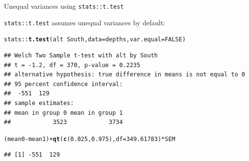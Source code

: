 \documentclass[10pt]{beamer}\usepackage[]{graphicx}\usepackage[]{color}
\makeatletter
\newcommand{\hlnum}[1]{\textcolor[rgb]{0.686,0.059,0.569}{#1}}%
\newcommand{\hlopt}[1]{\textcolor[rgb]{0,0,0}{#1}}%
\newcommand{\hlstd}[1]{\textcolor[rgb]{0.345,0.345,0.345}{#1}}%
\newcommand{\hlkwc}[1]{\textcolor[rgb]{0.333,0.667,0.333}{#1}}%
\newcommand{\hlkwd}[1]{\textcolor[rgb]{0.737,0.353,0.396}{\textbf{#1}}}%
\newenvironment{kframe}{%
 \def\at@end@of@kframe{}%
 \ifinner\ifhmode%
  \def\at@end@of@kframe{\end{minipage}}%
  \begin{minipage}{\columnwidth}%
 \fi\fi%
 \def\FrameCommand##1{\hskip\@totalleftmargin \hskip-\fboxsep
 \colorbox{shadecolor}{##1}\hskip-\fboxsep
     \hskip-\linewidth \hskip-\@totalleftmargin \hskip\columnwidth}%
 \MakeFramed {\advance\hsize-\width
   \@totalleftmargin\z@ \linewidth\hsize
   \@setminipage}}%
 {\par\unskip\endMakeFramed%
 \at@end@of@kframe}
\newenvironment{knitrout}{}{} %
\makeatother
\begin{document}
\begin{frame}[fragile]{Unequal variances using \texttt{stats::t.test}}
	
	\texttt{stats::t.test} assumes unequal variances by default:
	
	
\begin{knitrout}\scriptsize
{}\color{fgcolor}\begin{kframe}
\begin{alltt}
\hlstd{stats}\hlopt{::}\hlkwd{t.test}\hlstd{(alt} \hlopt{~} \hlstd{South,} \hlkwc{data} \hlstd{= depths,} \hlkwc{var.equal} \hlstd{=} \hlnum{FALSE}\hlstd{)}
\end{alltt}
\begin{verbatim}
## Welch Two Sample t-test with alt by South 
## t = -1.2, df = 370, p-value = 0.2235
## alternative hypothesis: true difference in means is not equal to 0 
## 95 percent confidence interval:
##  -551  129 
## sample estimates:
## mean in group 0 mean in group 1 
##            3523            3734
\end{verbatim}
\begin{alltt}
\hlstd{(mean0} \hlopt{-} \hlstd{mean1)} \hlopt{+} \hlkwd{qt}\hlstd{(}\hlkwd{c}\hlstd{(}\hlnum{0.025}\hlstd{,} \hlnum{0.975}\hlstd{),} \hlkwc{df} \hlstd{=} \hlnum{349.61783}\hlstd{)} \hlopt{*} \hlstd{SEM}
\end{alltt}
\begin{verbatim}
## [1] -551  129
\end{verbatim}
\end{kframe}
\end{knitrout}
	
	
\end{frame}
\end{document}
